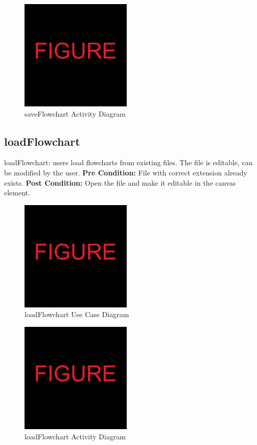\documentclass[11pt,a4paper,titlepage]{article}
\begin{document}
\begin{figure}[H]
  \centering
\includegraphics[width=200px]{figure.jpg}
\caption{saveFlowchart Activity Diagram}
\end{figure}

\newpage
\subsection{loadFlowchart}
loadFlowchart: users load flowcharts from existing files. The file is editable, can be modified by the user.\newline\newline
\textbf{Pre Condition:} File with correct extension already exists.\newline\newline
\textbf{Post Condition:} Open the file and make it editable in the canvas element.

\begin{figure}[H]
  \centering
\includegraphics[width=200px]{figure.jpg}
\caption{loadFlowchart Use Case Diagram}
\end{figure}

\begin{figure}[H]
  \centering
\includegraphics[width=200px]{figure.jpg}
\caption{loadFlowchart Activity Diagram}
\end{figure}
\end{document}
